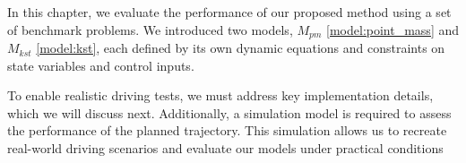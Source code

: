 In this chapter, we evaluate the performance of our proposed method using a set of benchmark problems.
We introduced two models, $M_{pm}$ \eqref{model:point_mass} and $M_{kst}$ \eqref{model:kst}, each defined by its own dynamic equations and
constraints on state variables and control inputs.

To enable realistic driving tests, we must address key implementation details, which we will discuss next.
Additionally, a simulation model is required to assess the performance of the planned trajectory.
This simulation allows us to recreate real-world driving scenarios
and evaluate our models under practical conditions